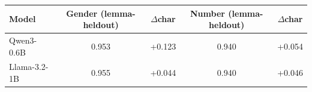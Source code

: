\begin{tabular}{lcccc}
\toprule
Model & Gender (lemma-heldout) & $\Delta$char & Number (lemma-heldout) & $\Delta$char \\
\midrule
  Qwen3-0.6B & 0.953 & +0.123 & 0.940 & +0.054 \\
  Llama-3.2-1B & 0.955 & +0.044 & 0.940 & +0.046 \\
\bottomrule
\end{tabular}
